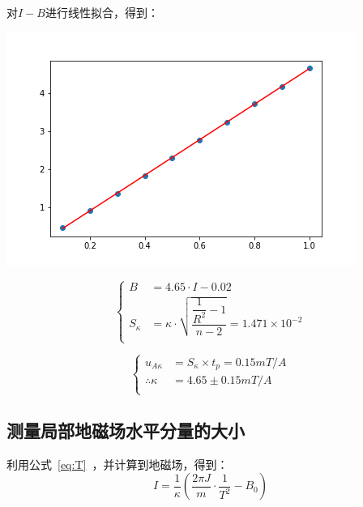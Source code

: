 \documentclass[a4paper]{ltxdoc}
\newenvironment{Figure}
{\par\medskip\noindent\minipage{\linewidth}}
{\endminipage\par\medskip}
\begin{document}
\begin{multicols}{2}
    对$I-B$进行线性拟合，得到：
    \begin{Figure}
        \centering
        \includegraphics[scale=0.5]{img/data_1.png}
    \end{Figure}
    \begin{equation}
        \left\{
        \begin{aligned}
            B        & = 4.65\cdot I - 0.02                                                         \\
            S_\kappa & = \kappa\cdot \sqrt{\dfrac{\dfrac {1} {R^2} -1}{n-2}} = 1.471 \times 10^{-2} \\
        \end{aligned}
        \right.
    \end{equation}

    \begin{equation}
        \left\{
        \begin{aligned}
            u_{A\kappa}       & = S_\kappa \times t_p = 0.15 mT/A \\
            \therefore \kappa & = 4.65 \pm 0.15 mT/A              \\
        \end{aligned}
        \right.
    \end{equation}

    \subsection{测量局部地磁场水平分量的大小}

    利用公式~\ref{eq:T}~，并计算到地磁场，得到：
    \begin{equation}
        I = \dfrac {1} {\kappa} (\dfrac{2\pi J}{m} \cdot \dfrac {1}{T^2} - B_0)
    \end{equation}


\end{multicols}
\end{document}
